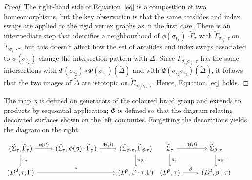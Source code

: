 \documentclass{amsart}
\theoremstyle{definition}
\def\ws{\widetilde{\Sigma}}
\begin{document}
\begin{proof}
The right-hand side of Equation~\ref{eq} is a composition of two homeomorphisms, but the key observation is that the same arcslides and index swaps are applied to the rigid vertex graphs as in the first case.  There is an intermediate step that identifies a neighbourhood of $\phi(\sigma_{i_1})\cdot \widetilde{\Gamma}_\tau$ with $\widetilde{\Gamma}_{\sigma_{i_1}\cdot \tau}$ on $\widetilde{\Sigma}_{\sigma_{i_1}\cdot \tau}$, but this doesn't affect how the set of arcslides and index swaps associated to $\phi(\sigma_{i_2})$ change the intersection pattern with $\widetilde{\Delta}$.  Since  $\widetilde{\Gamma}_{\sigma_{i_2}\sigma_{i_1}\cdot \tau}$ has the same intersections with  $\Phi(\sigma_{i_2})\circ \Phi(\sigma_{i_1})(\widetilde{\Delta})$ and with $\Phi(\sigma_{i_2}\sigma_{i_1})(\widetilde{\Delta})$, it follows that the two images of $\widetilde{\Delta}$ are istotopic on $\ws_{\sigma_{i_1}\sigma_{i_2}\cdot \tau}$.  Hence, Equation~\ref{eq} holds.



\end{proof}




The map $\phi$ is defined on generators of the coloured braid group and extends to products by sequential application; $\Phi$ is defined so that the diagram relating decorated surfaces shown on  the left commutes. Forgetting the decorations yields the diagram on the right.




\[
\begin{minipage}{0.48\textwidth}
\centering
\begin{tikzcd}
(\widetilde{\Sigma}_\tau, \widetilde{\Gamma}_\tau) \arrow[r, "\phi(\beta)"] \arrow[d, "\pi_\tau"]
& (\widetilde{\Sigma}_\tau, \phi(\beta)\cdot \widetilde{\Gamma}_\tau) \arrow[r, "\Phi(\beta)"]
& (\widetilde{\Sigma}_{\beta\cdot\tau}, \widetilde{\Gamma}_{\beta\cdot \tau}) \arrow[d, "\pi_{\beta\cdot \tau}"] \\
(D^2, \tau, \Gamma) \arrow[rr, "\beta"]
&& (D^2, \beta\cdot\tau, \Gamma)
\end{tikzcd}
\end{minipage}
\hspace{1.5cm}
\begin{minipage}{0.48\textwidth}
\centering
\begin{tikzcd}
\widetilde{\Sigma}_\tau \arrow[r, "\Phi(\beta)"] \arrow[d, "\pi_\tau"]
& \widetilde{\Sigma}_{\beta\cdot\tau} \arrow[d, "\pi_{\beta\cdot \tau}"] \\
(D^2, \tau) \arrow[r, "\beta"]
& (D^2, \beta\cdot\tau)
\end{tikzcd}
\end{minipage}
\]
\end{document}
